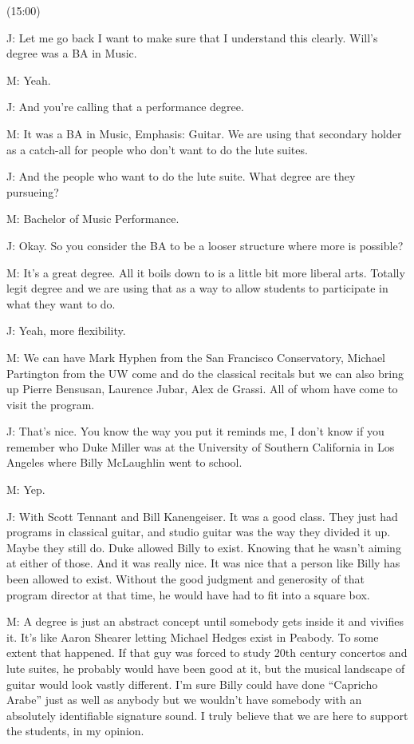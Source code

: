 \documentclass[11pt]{article}
\begin{document}
(15:00)

J: Let me go back I want to make sure that I understand this clearly. Will's degree was a BA in Music. 

M: Yeah.

J: And you're calling that a performance degree.

M: It was a BA in Music, Emphasis: Guitar. We are using that secondary holder as a catch-all for people who don't want to do the lute suites.

J: And the people who want to do the lute suite. What degree are they pursueing?

M: Bachelor of Music Performance.

J: Okay. So you consider the BA to be a looser structure where more is possible? 

M: It's a great degree. All it boils down to is a little bit more liberal arts. Totally legit degree and we are using that as a way to allow students to participate in what they want to do.

J: Yeah, more flexibility. 

M: We can have Mark Hyphen from the San Francisco Conservatory, Michael Partington from the UW come and do the classical recitals but we can also bring up Pierre Bensusan, Laurence Jubar, Alex de Grassi. All of whom have come to visit the program.

J: That's nice. You know the way you put it reminds me, I don't know if you remember who Duke Miller was at the University of Southern California in Los Angeles where Billy McLaughlin went to school.

M: Yep.

J: With Scott Tennant and Bill Kanengeiser. It was a good class. They just had programs in classical guitar, and studio guitar was the way they divided it up. Maybe they still do. Duke allowed Billy to exist. Knowing that he wasn't aiming at either of those. And it was really nice. It was nice that a person like Billy has been allowed to exist. Without the good judgment and generosity of that program director at that time, he would have had to fit into a square box. 

M: A degree is just an abstract concept until somebody gets inside it and vivifies it. It's like Aaron Shearer letting Michael Hedges exist in Peabody. To some extent that happened. If that guy was forced to study 20th century concertos and lute suites, he probably would have been good at it, but the musical landscape of guitar would look vastly different. I'm sure Billy could have done ``Capricho Arabe'' just as well as anybody but we wouldn't have somebody with an absolutely identifiable signature sound. I truly believe that we are here to support the students, in my opinion. 
\end{document}
